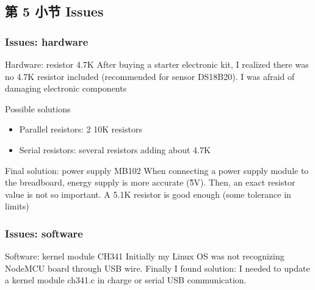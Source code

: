 \documentclass[
    aspectratio=169,                   %
]{beamer}
\begin{document}
\subsection{第 5 小节 Issues}

    \begin{frame}
        \frametitle{Issues: hardware}

        \begin{block}{Hardware: resistor 4.7K}
            After buying a starter electronic kit, I realized there was no 4.7K resistor included (recommended\cite{resistor} for sensor DS18B20). I was afraid of damaging electronic components
        \end{block}

        \begin{block}{Possible solutions}
            \begin{itemize}
                \item \alert{Parallel resistors}: 2 10K resistors
                \item \alert{Serial resistors}: several resistors adding about 4.7K
            \end{itemize}
        \end{block}

        \begin{block}{Final solution: power supply MB102}
            When connecting a power supply module to the breadboard, energy supply is more accurate (\~5V). Then, an exact resistor value is not so important. A 5.1K resistor is good enough (some tolerance in limits)
        \end{block}

    \end{frame}

    \begin{frame}
        \frametitle{Issues: software}

        \begin{block}{Software: kernel module CH341}
            Initially my Linux OS was not recognizing NodeMCU board through USB wire. Finally I found solution\cite{ch341}: I needed to update a kernel module \alert{ch341.c} in charge or serial USB communication.
        \end{block}
    \end{frame}


        
        
\end{document}

